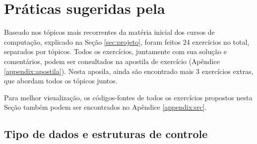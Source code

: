 \section{Práticas sugeridas pela \playAPC} \label{sec:praticas}
Baseado nos tópicos mais recorrentes da matéria inicial dos cursos de computação, explicado na Seção \ref{sec:projeto}, foram feitos 24 exercícios no total, separados por tópicos. Todos os exercícios, juntamente com sua solução e comentários, podem ser consultados na apostila de exercício (Apêndice \ref{appendix:apostila}). Nesta aposila, ainda são encontrado mais 3 exercícios extras, que abordam todos os tópicos juntos.

Para melhor visualização, os códigos-fontes de todos os exercícios propostos nesta Seção também podem ser encontrados no Apêndice \ref{appendix:src}.
\subsection{Tipo de dados e estruturas de controle}

